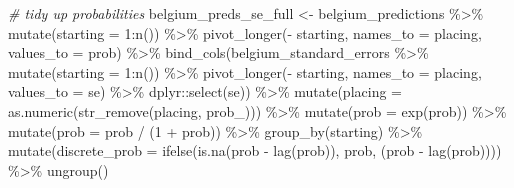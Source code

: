 \documentclass[
]{book}
\newenvironment{Shaded}{\begin{snugshade}}{\end{snugshade}}
\newcommand{\AttributeTok}[1]{\textcolor[rgb]{0.77,0.63,0.00}{#1}}
\newcommand{\CommentTok}[1]{\textcolor[rgb]{0.56,0.35,0.01}{\textit{#1}}}
\newcommand{\DecValTok}[1]{\textcolor[rgb]{0.00,0.00,0.81}{#1}}
\newcommand{\FunctionTok}[1]{\textcolor[rgb]{0.00,0.00,0.00}{#1}}
\newcommand{\NormalTok}[1]{#1}
\newcommand{\OtherTok}[1]{\textcolor[rgb]{0.56,0.35,0.01}{#1}}
\newcommand{\SpecialCharTok}[1]{\textcolor[rgb]{0.00,0.00,0.00}{#1}}
\newcommand{\StringTok}[1]{\textcolor[rgb]{0.31,0.60,0.02}{#1}}
\begin{document}
\begin{Shaded}
\begin{Highlighting}[]
\CommentTok{\# tidy up probabilities}
\NormalTok{belgium\_preds\_se\_full }\OtherTok{\textless{}{-}}\NormalTok{ belgium\_predictions }\SpecialCharTok{\%\textgreater{}\%}
  \FunctionTok{mutate}\NormalTok{(}\AttributeTok{starting =} \DecValTok{1}\SpecialCharTok{:}\FunctionTok{n}\NormalTok{()) }\SpecialCharTok{\%\textgreater{}\%}
  \FunctionTok{pivot\_longer}\NormalTok{(}\SpecialCharTok{{-}}\NormalTok{ starting, }\AttributeTok{names\_to =} \StringTok{\textquotesingle{}placing\textquotesingle{}}\NormalTok{, }\AttributeTok{values\_to =} \StringTok{\textquotesingle{}prob\textquotesingle{}}\NormalTok{) }\SpecialCharTok{\%\textgreater{}\%} 
  \FunctionTok{bind\_cols}\NormalTok{(belgium\_standard\_errors }\SpecialCharTok{\%\textgreater{}\%} \FunctionTok{mutate}\NormalTok{(}\AttributeTok{starting =} \DecValTok{1}\SpecialCharTok{:}\FunctionTok{n}\NormalTok{()) }\SpecialCharTok{\%\textgreater{}\%}
  \FunctionTok{pivot\_longer}\NormalTok{(}\SpecialCharTok{{-}}\NormalTok{ starting, }\AttributeTok{names\_to =} \StringTok{\textquotesingle{}placing\textquotesingle{}}\NormalTok{, }\AttributeTok{values\_to =} \StringTok{\textquotesingle{}se\textquotesingle{}}\NormalTok{) }\SpecialCharTok{\%\textgreater{}\%}
\NormalTok{    dplyr}\SpecialCharTok{::}\FunctionTok{select}\NormalTok{(se)) }\SpecialCharTok{\%\textgreater{}\%}
  \FunctionTok{mutate}\NormalTok{(}\AttributeTok{placing =} \FunctionTok{as.numeric}\NormalTok{(}\FunctionTok{str\_remove}\NormalTok{(placing, }\StringTok{\textquotesingle{}prob\_\textquotesingle{}}\NormalTok{))) }\SpecialCharTok{\%\textgreater{}\%}
  \FunctionTok{mutate}\NormalTok{(}\AttributeTok{prob =} \FunctionTok{exp}\NormalTok{(prob)) }\SpecialCharTok{\%\textgreater{}\%}
  \FunctionTok{mutate}\NormalTok{(}\AttributeTok{prob =}\NormalTok{ prob }\SpecialCharTok{/}\NormalTok{ (}\DecValTok{1} \SpecialCharTok{+}\NormalTok{ prob)) }\SpecialCharTok{\%\textgreater{}\%}
  \FunctionTok{group\_by}\NormalTok{(starting) }\SpecialCharTok{\%\textgreater{}\%} 
  \FunctionTok{mutate}\NormalTok{(}\AttributeTok{discrete\_prob =} \FunctionTok{ifelse}\NormalTok{(}\FunctionTok{is.na}\NormalTok{(prob }\SpecialCharTok{{-}} \FunctionTok{lag}\NormalTok{(prob)), prob, (prob }\SpecialCharTok{{-}} \FunctionTok{lag}\NormalTok{(prob)))) }\SpecialCharTok{\%\textgreater{}\%}
  \FunctionTok{ungroup}\NormalTok{()}


\end{Highlighting}
\end{Shaded}
\end{document}
